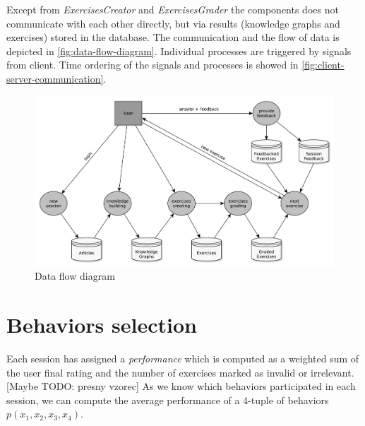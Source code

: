 \documentclass[a4paper, 12pt, twoside]{fithesis2}		%
\renewcommand{\_}{\leavevmode \kern0.0em\vbox{\hrule width0.4em}}
\begin{document}
Except from \textit{ExercisesCreator} and \textit{ExercisesGrader}
the components does not communicate with each other directly,
but via results (knowledge graphs and exercises) stored in the database.
The communication and the flow of data is depicted in \autoref{fig:data-flow-diagram}.
Individual processes are triggered by signals from client.
Time ordering of the signals and processes is showed in \autoref{fig:client-server-communication}.

\begin{figure}[h]
  \centering
  \includegraphics[width=\textwidth]{images/data-flow-diagram.pdf}
  \caption{Data flow diagram}
  \label{fig:data-flow-diagram}
\end{figure}

\section{Behaviors selection}
\label{sec:smartoo-behaviors-selection}

Each session has assigned a \textit{performance} which is computed as a weighted sum of the user final rating and the number of exercises marked as invalid or irrelevant. [Maybe TODO: presny vzorec]
As we know which behaviors participated in each session, we can compute the average performance of a 4-tuple of behaviors $p(x_1, x_2, x_3, x_4)$.
\end{document}
